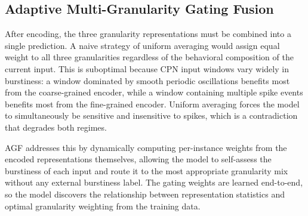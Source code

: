 \documentclass[journal]{IEEEtran}
\begin{document}
\subsection{Adaptive Multi-Granularity Gating Fusion}

After encoding, the three granularity representations must be combined into
a single prediction.
A naive strategy of uniform averaging would assign equal weight to all three
granularities regardless of the behavioral composition of the current input.
This is suboptimal because CPN input windows vary widely in burstiness:
a window dominated by smooth periodic oscillations benefits most from the
coarse-grained encoder, while a window containing multiple spike events
benefits most from the fine-grained encoder.
Uniform averaging forces the model to simultaneously be sensitive and
insensitive to spikes, which is a contradiction that degrades both regimes.

AGF addresses this by dynamically computing per-instance weights from the
encoded representations themselves, allowing the model to self-assess the
burstiness of each input and route it to the most appropriate granularity
mix without any external burstiness label.
The gating weights are learned end-to-end, so the model discovers the
relationship between representation statistics and optimal granularity
weighting from the training data.
\end{document}
